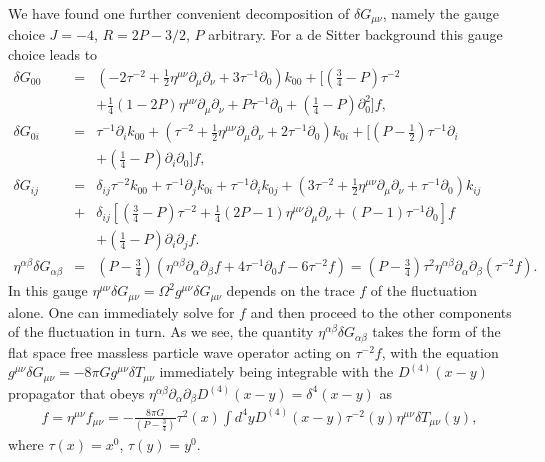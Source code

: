 We have found one further convenient decomposition of $\delta G_{\mu\nu}$, namely the gauge choice $J=-4$, $R=2P-3/2$, $P$ arbitrary. For a de Sitter background this gauge choice leads to
%
\begin{eqnarray}
\delta G_{00}&=&(-2 \tau^{-2}
+ \tfrac{1}{2} \eta^{\mu \nu} \partial_{\mu} \partial_{\nu}
+ 3 \tau^{-1} \partial_{0}) k_{00}
+ \big[(\tfrac{3}{4} -  P) \tau^{-2} 
\nonumber\\
&&
+ \tfrac{1}{4}(1-2P) \eta^{\mu \nu} \partial_{\mu} \partial_{\nu}
+ P \tau^{-1} \partial_{0}
+( \tfrac{1}{4} -P)\partial^2_{0}\big]f,
\nonumber\\
\delta G_{0i}&=&\tau^{-1} \partial_{i} k_{00}
+ (\tau^{-2}
+ \tfrac{1}{2} \eta^{\mu \nu} \partial_{\mu} \partial_{\nu}
+ 2 \tau^{-1} \partial_{0}) k_{0i}
+ \big[(P- \tfrac{1}{2}) \tau^{-1} \partial_{i} 
\nonumber\\
&&
+ (\tfrac{1}{4}-P) \partial_{i} \partial_{0} \big]f,
\nonumber\\
\delta G_{ij}&=&\delta_{ij}\tau^{-2} k_{00}
+\tau^{-1} \partial_{j} k_{0i}
+ \tau^{-1} \partial_{i} k_{0j}
+ (3 \tau^{-2}
+ \tfrac{1}{2} \eta^{\mu \nu} \partial_{\mu} \partial_{\nu}
+ \tau^{-1} \partial_{0}) k_{ij}
\nonumber\\
&+& \delta_{ij}\left[(\tfrac{3}{4}-P) \tau^{-2}
+ \tfrac{1}{4}(2P-1) \eta^{\mu \nu} \partial_{\mu} \partial_{\nu}
+(P-1)\tau^{-1} \partial_{0}\right]f 
\nonumber\\
&&
+ (\tfrac{1}{4}-P) \partial_{i} \partial_{j}f.
\\
\eta^{\alpha\beta}\delta G_{\alpha\beta}&=&(P-\tfrac{3}{4})( \eta^{\alpha\beta}\partial_{\alpha}\partial_{\beta}f +4\tau^{-1}\partial_0 f-6\tau^{-2}f)=(P-\tfrac{3}{4})\tau^2 \eta^{\alpha\beta}\partial_{\alpha}\partial_{\beta}(\tau^{-2}f).
\nonumber
\label{D6}
\end{eqnarray}
%
In this gauge $\eta^{\mu\nu}\delta G_{\mu\nu}=\Omega^2g^{\mu\nu}\delta G_{\mu\nu}$ depends on the trace $f$ of the fluctuation alone. One can immediately solve for $f$ and then proceed to the other components of the fluctuation in turn. As we see,  the quantity $\eta^{\alpha\beta}\delta G_{\alpha\beta}$ takes the form of the flat space free massless particle wave operator acting on $\tau^{-2} f$, with the equation $g^{\mu\nu}\delta G_{\mu\nu}=-8\pi G g^{\mu\nu}\delta T_{\mu\nu}$ immediately being integrable with the $D^{(4)}(x-y)$ propagator that obeys $\eta^{\alpha\beta}\partial_{\alpha}\partial_{\beta}D^{(4)}(x-y)=\delta^4(x-y)$ as
%
\begin{eqnarray}
f=\eta^{\mu\nu}f_{\mu\nu}=-\frac{8\pi G}{(P-\tfrac{3}{4})}\tau^2(x) \int d^4yD^{(4)}(x-y)\tau^{-2}(y)\eta^{\mu\nu}\delta T_{\mu\nu}(y),
\label{D7}
\end{eqnarray}
%
where $\tau(x)=x^0$, $\tau(y)=y^0$.




